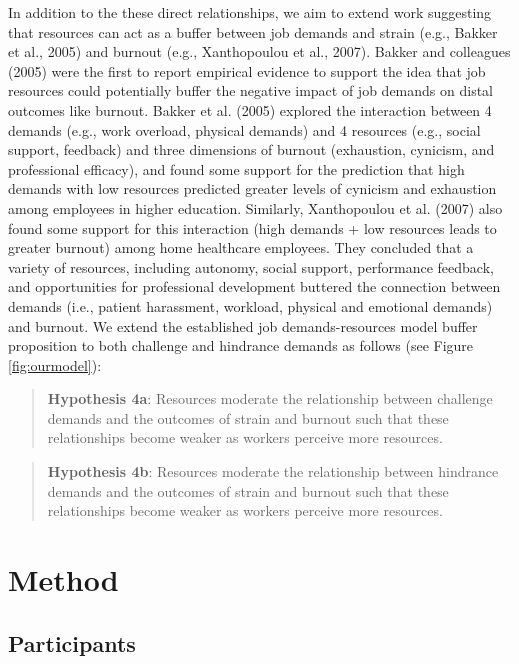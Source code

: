 \documentclass[
  man]{apa7}
\begin{document}
In addition to the these direct relationships, we aim to extend work suggesting that resources can act as a buffer between job demands and strain (e.g., Bakker et al., 2005) and burnout (e.g., Xanthopoulou et al., 2007). Bakker and colleagues (2005) were the first to report empirical evidence to support the idea that job resources could potentially buffer the negative impact of job demands on distal outcomes like burnout. Bakker et al. (2005) explored the interaction between 4 demands (e.g., work overload, physical demands) and 4 resources (e.g., social support, feedback) and three dimensions of burnout (exhaustion, cynicism, and professional efficacy), and found some support for the prediction that high demands with low resources predicted greater levels of cynicism and exhaustion among employees in higher education. Similarly, Xanthopoulou et al. (2007) also found some support for this interaction (high demands + low resources leads to greater burnout) among home healthcare employees. They concluded that a variety of resources, including autonomy, social support, performance feedback, and opportunities for professional development buttered the connection between demands (i.e., patient harassment, workload, physical and emotional demands) and burnout. We extend the established job demands-resources model buffer proposition to both challenge and hindrance demands as follows (see Figure \ref{fig:ourmodel}):

\begin{quote}
\textbf{Hypothesis 4a}: Resources moderate the relationship between challenge demands and the outcomes of strain and burnout such that these relationships become weaker as workers perceive more resources.
\end{quote}

\begin{quote}
\textbf{Hypothesis 4b}: Resources moderate the relationship between hindrance demands and the outcomes of strain and burnout such that these relationships become weaker as workers perceive more resources.
\end{quote}

\section{Method}\label{method}

\subsection{Participants}\label{participants}
\end{document}
